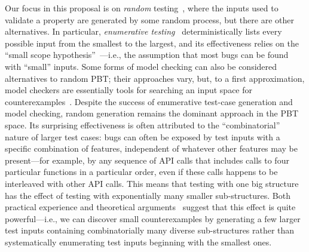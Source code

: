 %
Our focus in this proposal is on {\em random}
testing~\cite{hamlet1994random}, where the inputs used to validate a
property are generated by some random process, but there are other
alternatives. In particular, {\em enumerative
  testing}~\cite[etc.]{DBLP:conf/haskell/RuncimanNL08, leancheck}
deterministically lists every possible input from the smallest to the
largest, and its effectiveness relies on the ``small scope
hypothesis''~\cite{jackson1996elements}---i.e., the assumption that
most bugs can be found
with ``small'' inputs. Some\iflater{}\fi{} forms of model
checking can also be considered alternatives to random PBT; their
approaches vary, but, to a first approximation, model checkers are
essentially tools for searching an input space for
counterexamples~\cite{biere2009bounded}.
%
Despite the success of enumerative test-case generation and model
checking, random generation remains the dominant approach in the PBT
space. Its surprising effectiveness is often attributed to the
``combinatorial'' nature of larger test cases: bugs can often be
exposed by test inputs with a specific combination of features,
independent of whatever other features may be present---for example,
by any sequence of API calls that includes calls to four particular
functions in a particular order, even if these calls happens to be
interleaved with other API calls.  This means that testing with one
big structure has the effect of testing with exponentially many
smaller sub-structures. Both practical experience and theoretical
arguments~\cite{HarryPaper} suggest that this effect is quite
powerful---i.e., we can discover small counterexamples by generating
a few larger test inputs containing combinatorially many diverse
sub-structures rather than systematically enumerating test inputs
beginning with the smallest ones. 

